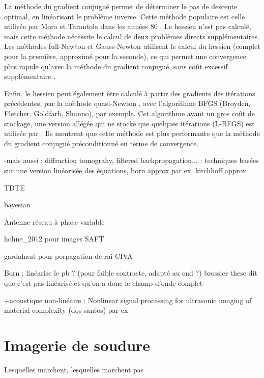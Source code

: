 La méthode du gradient conjugué permet de déterminer le pas de descente optimal, en linéarisant le problème inverse. Cette méthode populaire est celle utilisée par Mora et Tarantola dans les années 80 \citep{tarantola_84, mora_87a, mora_87b}. Le hessien n'est pas calculé, mais cette méthode nécessite le calcul de deux problèmes directs supplémentaires. \\

Les méthodes full-Newton et Gauss-Newton utilisent le calcul du hessien (complet pour la première, approximé pour la seconde), ce qui permet une convergence plus rapide qu'avec la méthode du gradient conjugué, sans coût excessif supplémentaire \citep{pratt_98}.

Enfin, le hessien peut également être calculé à partir des gradients des itérations précédentes, par la méthode quasi-Newton \citep{nocedal}, avec l'algorithme BFGS (Broyden, Fletcher, Goldfarb, Shanno), par exemple. Cet algorithme ayant un gros coût de stockage, une version allégée qui ne stocke que quelques itérations (L-BFGS) est utilisée par \cite{brossier_2009}. Ils montrent que cette méthode est plus performante que la méthode du gradient conjugué préconditionné en terme de convergence. 

\todo[inline]{}


-mais aussi : diffraction tomograhy, filtered backpropagation... : techniques basées sur une version linéarisée des équations, born approx par ex, kirchhoff approx



TDTE

bayesian


Antenne réseau à phase variable



hohne\_2012 pour images SAFT


gardahaut pour porpagation de rai CIVA

Born : linéarise le pb ? (pour faible contraste, adapté au cnd ?) brossier these dit que c'est pas linéarisé et qu'on a donc le champ d'onde complet

+acoustique non-linéaire : Nonlinear signal processing for ultrasonic imaging of material complexity (dos santos) par ex

\section{Imagerie de soudure}
Lesquelles marchent, lesquelles marchent pas
